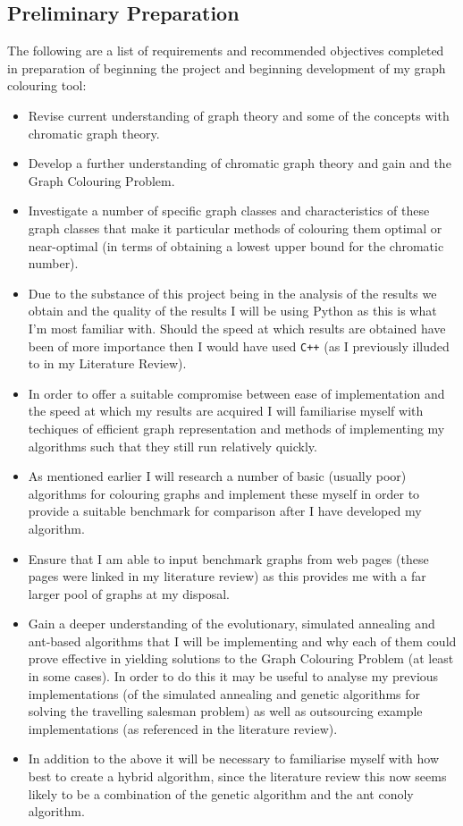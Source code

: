 \documentclass[12pt, a4paper]{article}
\begin{document}
\subsection*{Preliminary Preparation}
The following are a list of requirements and recommended objectives completed in preparation of beginning the project and beginning development of my graph colouring tool:
\begin{itemize}
\renewcommand\labelitemi{\tiny$\bullet$}
\item Revise current understanding of graph theory and some of the concepts with chromatic graph theory.
\item Develop a further understanding of chromatic graph theory and gain and the Graph Colouring Problem.
\item Investigate a number of specific graph classes and characteristics of these graph classes that make it particular methods of colouring them optimal or near-optimal (in terms of obtaining a lowest upper bound for the chromatic number).
\item Due to the substance of this project being in the analysis of the results we obtain and the quality of the results I will be using Python as this is what I'm most familiar with. Should the speed at which results are obtained have been of more importance then I would have used \verb!C++! (as I previously illuded to in my Literature Review).
\item In order to offer a suitable compromise between ease of implementation and the speed at which my results are acquired I will familiarise myself with techiques of efficient graph representation and methods of implementing my algorithms such that they still run relatively quickly.
\item As mentioned earlier I will research a number of basic (usually poor) algorithms for colouring graphs and implement these myself in order to provide a suitable benchmark for comparison after I have developed my algorithm.
\item Ensure that I am able to input benchmark graphs from web pages (these pages were linked in my literature review) as this provides me with a far larger pool of graphs at my disposal.
\item Gain a deeper understanding of the evolutionary, simulated annealing and ant-based algorithms that I will be implementing and why each of them could prove effective in yielding solutions to the Graph Colouring Problem (at least in some cases). In order to do this it may be useful to analyse my previous implementations (of the simulated annealing and genetic algorithms for solving the travelling salesman problem) as well as outsourcing example implementations (as referenced in the literature review).
\item In addition to the above it will be necessary to familiarise myself with how best to create a hybrid algorithm, since the literature review this now seems likely to be a combination of the genetic algorithm and the ant conoly algorithm.
\end{itemize}                                                                                                                                                              
\end{document}
